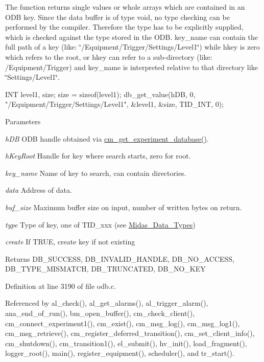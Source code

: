 The function returns single values or whole arrays which are contained in an ODB key. Since the data buffer is of type void, no type checking can be performed by the compiler. Therefore the type has to be explicitly supplied, which is checked against the type stored in the ODB. key\_\-name can contain the full path of a key (like: \char`\"{}/Equipment/Trigger/Settings/Level1\char`\"{}) while hkey is zero which refers to the root, or hkey can refer to a sub-\/directory (like: /Equipment/Trigger) and key\_\-name is interpreted relative to that directory like \char`\"{}Settings/Level1\char`\"{}. 
\begin{DoxyCode}
INT level1, size;
  size = sizeof(level1);
  db_get_value(hDB, 0, "/Equipment/Trigger/Settings/Level1",
                                   &level1, &size, TID_INT, 0);
\end{DoxyCode}
 
\begin{DoxyParams}{Parameters}
\item[{\em hDB}]ODB handle obtained via \hyperlink{group__cmfunctionc_ga16b33b70783a3f5ba98b4094149d12b7}{cm\_\-get\_\-experiment\_\-database()}. \item[{\em hKeyRoot}]Handle for key where search starts, zero for root. \item[{\em key\_\-name}]Name of key to search, can contain directories. \item[{\em data}]Address of data. \item[{\em buf\_\-size}]Maximum buffer size on input, number of written bytes on return. \item[{\em type}]Type of key, one of TID\_\-xxx (see \hyperlink{F_Midas_Code_and_Libraries_Midas_Data_Types}{Midas\_\-Data\_\-Types}) \item[{\em create}]If TRUE, create key if not existing \end{DoxyParams}
\begin{DoxyReturn}{Returns}
DB\_\-SUCCESS, DB\_\-INVALID\_\-HANDLE, DB\_\-NO\_\-ACCESS, DB\_\-TYPE\_\-MISMATCH, DB\_\-TRUNCATED, DB\_\-NO\_\-KEY 
\end{DoxyReturn}


Definition at line 3190 of file odb.c.

Referenced by al\_\-check(), al\_\-get\_\-alarms(), al\_\-trigger\_\-alarm(), ana\_\-end\_\-of\_\-run(), bm\_\-open\_\-buffer(), cm\_\-check\_\-client(), cm\_\-connect\_\-experiment1(), cm\_\-exist(), cm\_\-msg\_\-log(), cm\_\-msg\_\-log1(), cm\_\-msg\_\-retrieve(), cm\_\-register\_\-deferred\_\-transition(), cm\_\-set\_\-client\_\-info(), cm\_\-shutdown(), cm\_\-transition1(), el\_\-submit(), hv\_\-init(), load\_\-fragment(), logger\_\-root(), main(), register\_\-equipment(), scheduler(), and tr\_\-start().
